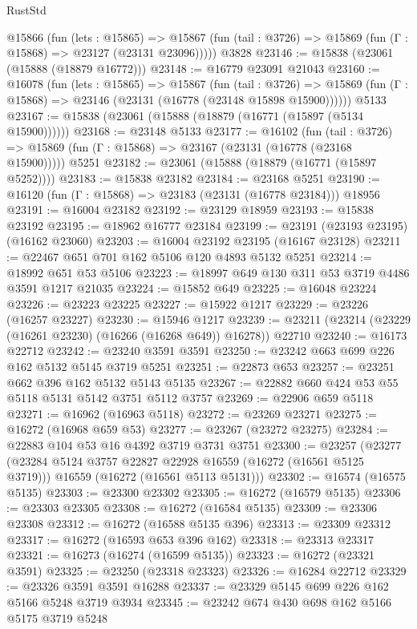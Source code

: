 \begin{lexlean}{RustStd}
\begin{coremodule}
    @15866
      (fun (lets : @15865) =>
      @15867 (fun (tail : @3726) => @15869 (fun (Γ : @15868) => @23127 (@23131 @23096)))))
    @3828
@23146 := @15838 (@23061 (@15888 (@18879 @16772)))
@23148 := @16779 @23091 @21043
@23160 := @16078
    (fun (lets : @15865) =>
    @15867
      (fun (tail : @3726) =>
      @15869 (fun (Γ : @15868) => @23146 (@23131 (@16778 (@23148 @15898 @15900))))))
    @5133
@23167 := @15838 (@23061 (@15888 (@18879 (@16771 (@15897 (@5134 @15900))))))
@23168 := @23148 @5133
@23177 := @16102
    (fun (tail : @3726) => @15869 (fun (Γ : @15868) => @23167 (@23131 (@16778 (@23168 @15900)))))
    @5251
@23182 := @23061 (@15888 (@18879 (@16771 (@15897 @5252))))
@23183 := @15838 @23182
@23184 := @23168 @5251
@23190 := @16120 (fun (Γ : @15868) => @23183 (@23131 (@16778 @23184))) @18956
@23191 := @16004 @23182
@23192 := @23129 @18959
@23193 := @15838 @23192
@23195 := @18962 @16777 @23184
@23199 := @23191 (@23193 @23195) (@16162 @23060)
@23203 := @16004 @23192 @23195 (@16167 @23128)
@23211 := @22467 @651 @701 @162 @5106 @120 @4893 @5132 @5251
@23214 := @18992 @651 @53 @5106
@23223 := @18997 @649 @130 @311 @53 @3719 @4486 @3591 @1217 @21035
@23224 := @15852 @649
@23225 := @16048 @23224
@23226 := @23223 @23225
@23227 := @15922 @1217
@23229 := @23226 (@16257 @23227)
@23230 := @15946 @1217
@23239 := @23211 (@23214 (@23229 (@16261 @23230) (@16266 (@16268 @649)) @16278)) @22710
@23240 := @16173 @22712
@23242 := @23240 @3591 @3591
@23250 := @23242 @663 @699 @226 @162 @5132 @5145 @3719 @5251
@23251 := @22873 @653
@23257 := @23251 @662 @396 @162 @5132 @5143 @5135
@23267 := @22882 @660 @424 @53 @55 @5118 @5131 @5142 @3751 @5112 @3757
@23269 := @22906 @659 @5118
@23271 := @16962 (@16963 @5118)
@23272 := @23269 @23271
@23275 := @16272 (@16968 @659 @53)
@23277 := @23267 (@23272 @23275)
@23284 := @22883 @104 @53 @16 @4392 @3719 @3731 @3751
@23300 := @23257
    (@23277
      (@23284 @5124 @3757 @22827 @22928 @16559 (@16272 (@16561 @5125 @3719)))
      @16559
      (@16272 (@16561 @5113 @5131)))
@23302 := @16574 (@16575 @5135)
@23303 := @23300 @23302
@23305 := @16272 (@16579 @5135)
@23306 := @23303 @23305
@23308 := @16272 (@16584 @5135)
@23309 := @23306 @23308
@23312 := @16272 (@16588 @5135 @396)
@23313 := @23309 @23312
@23317 := @16272 (@16593 @653 @396 @162)
@23318 := @23313 @23317
@23321 := @16273 (@16274 (@16599 @5135))
@23323 := @16272 (@23321 @3591)
@23325 := @23250 (@23318 @23323)
@23326 := @16284 @22712
@23329 := @23326 @3591 @3591 @16288
@23337 := @23329 @5145 @699 @226 @162 @5166 @5248 @3719 @3934
@23345 := @23242 @674 @430 @698 @162 @5166 @5175 @3719 @5248

\end{coremodule}
\end{lexlean}
